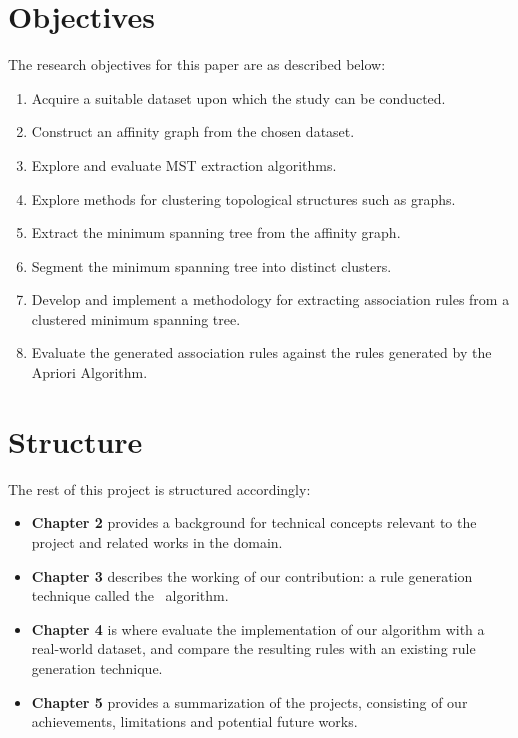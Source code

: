 \section{Objectives}
The research objectives for this paper are as described below:
\begin{enumerate}
\item Acquire a suitable dataset upon which the study can be conducted.
\item Construct an affinity graph from the chosen dataset.
\item Explore and evaluate MST extraction algorithms.
\item Explore methods for clustering topological structures such as graphs.
\item Extract the minimum spanning tree from the affinity graph.
\item Segment the minimum spanning tree into distinct clusters.
\item Develop and implement a methodology for extracting association rules from a clustered minimum spanning tree.
\item Evaluate the generated association rules against the rules generated by the Apriori Algorithm.
\end{enumerate}

\section{Structure}
The rest of this project is structured accordingly:
\begin{itemize}
\item \textbf{Chapter 2} provides a background for technical concepts relevant to the project and related works in the domain.
\item \textbf{Chapter 3} describes the working of our contribution: a rule generation technique called the \algo\ algorithm.
\item \textbf{Chapter 4} is where evaluate the implementation of our algorithm with a real-world dataset, and compare the resulting rules with an existing rule generation technique.
\item \textbf{Chapter 5} provides a summarization of the projects, consisting of our achievements, limitations and potential future works.
\end{itemize}